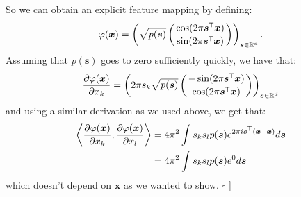 \documentclass[twoside]{article}
\newcommand{\transpose}[1]{#1^{\mbox{\sf \scriptsize T}}}
\begin{document}
So we can obtain an explicit feature mapping by defining:
$$
\varphi(\bm{x}) = \left( \sqrt{p(\bm{s})} \left( {\cos(2\pi \transpose{\bm{s}}\bm{x}) \atop \sin(2\pi \transpose{\bm{s}}\bm{x})} \right) \right)_{\bm{s} \in \mathbb{R}^d}.
$$
Assuming that $p(\bm{s})$ goes to zero sufficiently quickly, we have that:
$$
\frac{\partial \varphi(\bm{x})}{\partial x_k} = \left( 2\pi s_k \sqrt{p(\bm{s})} \left( {-\sin(2\pi \transpose{\bm{s}}\bm{x}) \atop \cos(2\pi \transpose{\bm{s}}\bm{x})} \right) \right)_{\bm{s} \in \mathbb{R}^d}
$$
and using a similar derivation as we used above, we get that:
\begin{align*}
\left\langle\frac{\partial\varphi(\bm{x})}{\partial x_k} ,  \frac{\partial\varphi(\bm{x})}{\partial x_l}\right\rangle &= 4\pi^2 \int
s_k s_l p(\bm{s}) e^{2\pi i \transpose{\bm{s}} (\bm{x}-\bm{x})} d\bm{s} \\
&=  4\pi^2 \int
s_k s_l p(\bm{s}) e^{0} d\bm{s}
\end{align*}
which doesn't depend on $\bm{x}$ as we wanted to show. $\square$
]
\end{document}
